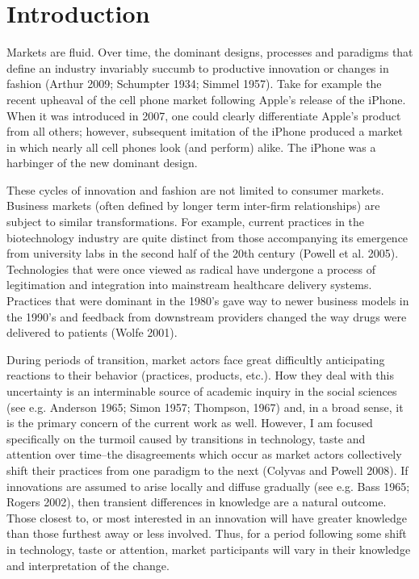 \chapter{Introduction\label{intro}}

Markets are fluid. Over time, the dominant designs, processes and paradigms that define an industry invariably succumb to productive innovation or changes in fashion (Arthur 2009; Schumpter 1934; Simmel 1957). Take for example the recent upheaval of the cell phone market following Apple's release of the iPhone. When it was introduced in 2007, one could clearly differentiate Apple's product from all others; however, subsequent imitation of the iPhone produced a market in which nearly all cell phones look (and perform) alike. The iPhone was a harbinger of the new dominant design.

These cycles of innovation and fashion are not limited to consumer markets. Business markets (often defined by longer term inter-firm relationships) are subject to similar transformations. For example, current practices in the biotechnology industry are quite distinct from those accompanying its emergence from university labs in the second half of the 20th century (Powell et al. 2005). Technologies that were once viewed as radical have undergone a process of legitimation and integration into mainstream healthcare delivery systems. Practices that were dominant in the 1980's gave way to newer business models in the 1990's and feedback from downstream providers changed the way drugs were delivered to patients (Wolfe 2001). 

During periods of transition, market actors face great difficultly anticipating reactions to their behavior (practices, products, etc.). How they deal with this uncertainty is an interminable source of academic inquiry in the social sciences (see e.g. Anderson 1965; Simon 1957; Thompson, 1967) and, in a broad sense, it is the primary concern of the current work as well. However, I am focused specifically on the turmoil caused by transitions in technology, taste and attention over time--the disagreements which occur as market actors collectively shift their practices from one paradigm to the next (Colyvas and Powell 2008). If innovations are assumed to arise locally and diffuse gradually (see e.g. Bass 1965; Rogers 2002), then transient differences in knowledge are a natural outcome. Those closest to, or most interested in an innovation will have greater knowledge than those furthest away or less involved. Thus, for a period following some shift in technology, taste or attention, market participants will vary in their knowledge and interpretation of the change.

